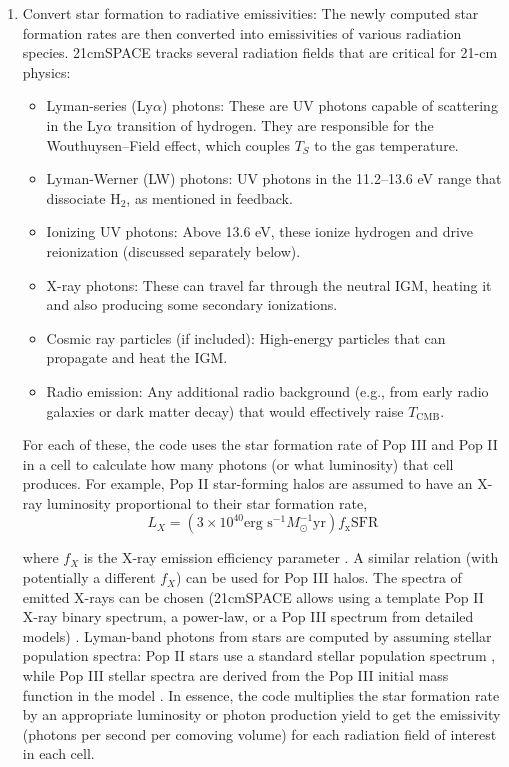 \documentclass[floats,floatfix,showpacs,amssymb,prd,superscriptaddress,nofootinbib]{revtex4-2} %
\begin{document}
\begin{enumerate}
    \item Convert star formation to radiative emissivities: The newly computed star formation rates are then converted into emissivities of various radiation species. 21cmSPACE tracks several radiation fields that are critical for 21-cm physics:
    \begin{itemize}
        \item Lyman-series (Ly$\alpha$) photons: These are UV photons capable of scattering in the Ly$\alpha$ transition of hydrogen. They are responsible for the Wouthuysen–Field effect, which couples $T_S$ to the gas temperature.

        \item Lyman-Werner (LW) photons: UV photons in the 11.2–13.6 eV range that dissociate $\mathrm{H}_2$, as mentioned in feedback.

        \item Ionizing UV photons: Above 13.6 eV, these ionize hydrogen and drive reionization (discussed separately below).

        \item X-ray photons: These can travel far through the neutral IGM, heating it and also producing some secondary ionizations.

        \item Cosmic ray particles (if included): High-energy particles that can propagate and heat the IGM.

        \item Radio emission: Any additional radio background (e.g., from early radio galaxies or dark matter decay) that would effectively raise $T_{\text{CMB}}$.
    \end{itemize}

    For each of these, the code uses the star formation rate of Pop III and Pop II in a cell to calculate how many photons (or what luminosity) that cell produces. For example, Pop II star-forming halos are assumed to have an X-ray luminosity proportional to their star formation rate, 
    \begin{equation}
        L_X = (3\times10^{40} \text{erg s}^{-1} M_\odot^{-1}\text{yr}) f_{\text{x}} \text{SFR}
    \end{equation}
    
    where $f_X$ is the X-ray emission efficiency parameter \citep{gessey-jones_2024}. A similar relation (with potentially a different $f_X$) can be used for Pop III halos. The spectra of emitted X-rays can be chosen (21cmSPACE allows using a template Pop II X-ray binary spectrum, a power-law, or a Pop III spectrum from detailed models) \citep{gessey-jones_2024}. Lyman-band photons from stars are computed by assuming stellar population spectra: Pop II stars use a standard stellar population spectrum \citep{Leitherer_1999}, while Pop III stellar spectra are derived from the Pop III initial mass function in the model \citep{gessey-jones_2024}. In essence, the code multiplies the star formation rate by an appropriate luminosity or photon production yield to get the emissivity (photons per second per comoving volume) for each radiation field of interest in each cell.


\end{enumerate}
\end{document}
